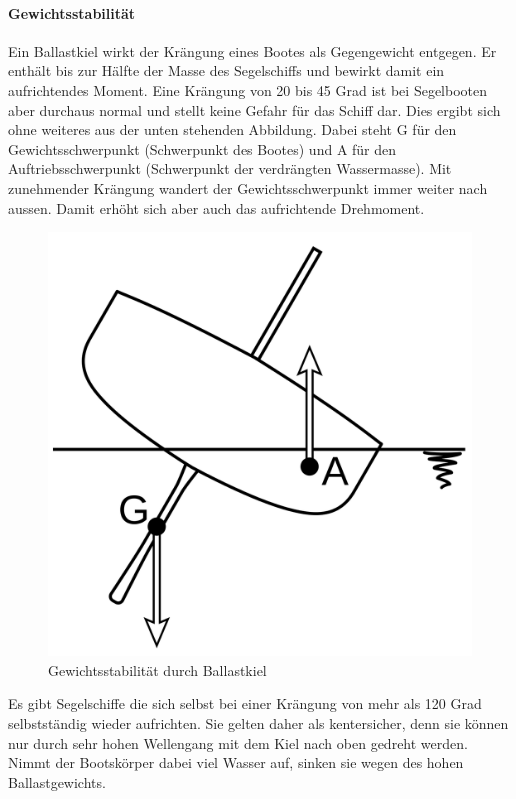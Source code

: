 \paragraph{Gewichtsstabilität}
Ein Ballastkiel wirkt der Krängung eines Bootes als Gegengewicht entgegen. Er enthält bis zur Hälfte der Masse des Segelschiffs und bewirkt damit ein aufrichtendes Moment. Eine Krängung von 20 bis 45 Grad ist bei Segelbooten aber durchaus normal und stellt keine Gefahr für das Schiff dar. Dies ergibt sich ohne weiteres aus der unten stehenden Abbildung. Dabei steht G für den Gewichtsschwerpunkt (Schwerpunkt des Bootes) und A für den Auftriebsschwerpunkt (Schwerpunkt der verdrängten Wassermasse). Mit zunehmender Krängung wandert der Gewichtsschwerpunkt immer weiter nach aussen. Damit erhöht sich aber auch das aufrichtende Drehmoment. 
\begin{figure}[H]
    \centering
    \includegraphics[width=0.25\linewidth]{Segeln_Gewichtsstabilitaet.svg.png}
    \caption{Gewichtsstabilität durch Ballastkiel }
    \label{fig:enter-label}
\end{figure}
Es gibt Segelschiffe die sich selbst bei einer Krängung von mehr als 120 Grad selbstständig wieder aufrichten. Sie gelten daher als kentersicher, denn sie können nur durch sehr hohen Wellengang mit dem Kiel nach oben gedreht werden. Nimmt der Bootskörper dabei viel Wasser auf, sinken sie wegen des hohen Ballastgewichts. 
